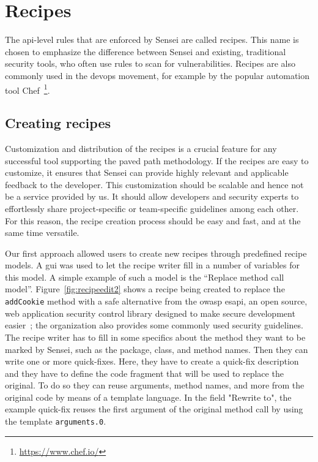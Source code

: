 \section{Recipes}

The \gls{api}-level rules that are enforced by Sensei are called recipes.
This name is chosen to emphasize the difference between Sensei and existing, traditional security tools, who often use rules to scan for vulnerabilities.
Recipes are also commonly used in the \gls{devops} movement, for example by the popular automation tool Chef~\footnote{\url{https://www.chef.io/}}.

\subsection{Creating recipes}
Customization and distribution of the recipes is a crucial feature for any successful tool supporting the paved path methodology.
If the recipes are easy to customize, it ensures that Sensei can provide highly relevant and applicable feedback to the developer.
This customization should be scalable and hence not be a service provided by us.
It should allow developers and security experts to effortlessly share project-specific or team-specific guidelines among each other.
For this reason, the recipe creation process should be easy and fast, and at the same time versatile. 

Our first approach allowed users to create new recipes through predefined recipe models.
A \gls{gui} was used to let the recipe writer fill in a number of variables for this model.
A simple example of such a model is  the “Replace method call model”.
Figure~\ref{fig:recipeedit2} shows a recipe being created to replace the \texttt{addCookie} method with a safe alternative from the \gls{owasp} \gls{esapi}, an open source, web application security control library designed to make secure development easier~\cite{ESAPI}; the organization also provides some commonly used security guidelines.
The recipe writer has to fill in some specifics about the method they want to be marked by Sensei, such as the package, class, and method names.
Then they can write one or more quick-fixes.
Here, they have to create a quick-fix description and they have to define the code fragment that will be used to replace the original.
To do so they can reuse arguments, method names, and more from the original code by means of a template language.
In the field "Rewrite to", the example quick-fix reuses the first argument of the original method call by using the template \texttt{arguments.0}. 

